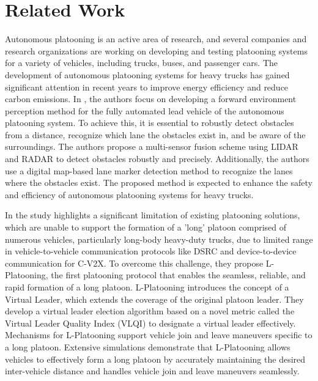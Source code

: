 \chapter{Related Work} 


Autonomous platooning is an active area of research, and several companies and research organizations \cite{lit_1} \cite{lit_2} \cite{lit_3} \cite{lit_4} \cite{lit_5} are working on developing and testing platooning systems for a variety of vehicles, including trucks, buses, and passenger cars.
The development of autonomous platooning systems for heavy trucks has gained significant attention in recent years to improve energy efficiency and reduce carbon emissions. In \cite{lit_1}, the authors focus on developing a forward environment perception method for the fully automated lead vehicle of the autonomous platooning system. To achieve this, it is essential to robustly detect obstacles from a distance, recognize which lane the obstacles exist in, and be aware of the surroundings. The authors propose a multi-sensor fusion scheme using LIDAR and RADAR to detect obstacles robustly and precisely. Additionally, the authors use a digital map-based lane marker detection method to recognize the lanes where the obstacles exist. The proposed method is expected to enhance the safety and efficiency of autonomous platooning systems for heavy trucks.

In \cite{lit_2} the study highlights a significant limitation of existing platooning solutions, which are unable to support the formation of a 'long' platoon comprised of numerous vehicles, particularly long-body heavy-duty trucks, due to limited range in vehicle-to-vehicle communication protocols like DSRC and device-to-device communication for C-V2X. To overcome this challenge, they propose L-Platooning, the first platooning protocol that enables the seamless, reliable, and rapid formation of a long platoon. L-Platooning introduces the concept of a Virtual Leader, which extends the coverage of the original platoon leader. They develop a virtual leader election algorithm based on a novel metric called the Virtual Leader Quality Index (VLQI) to designate a virtual leader effectively. Mechanisms for L-Platooning support vehicle join and leave maneuvers specific to a long platoon. Extensive simulations demonstrate that L-Platooning allows vehicles to effectively form a long platoon by accurately maintaining the desired inter-vehicle distance and handles vehicle join and leave maneuvers seamlessly.

